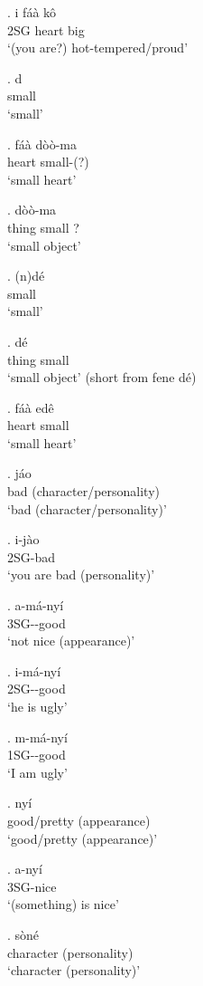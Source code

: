 \documentclass{assets/fieldnotes}
\begin{document}
\exg. i fáà kô\\
2SG heart big\\
`(you are?) hot-tempered/proud'

\exg. d\\
small\\
`small'

\exg. fáà dòò-ma\\
heart small-(?)\\
`small heart'

\exg.  dòò-ma\\
thing small ?\\
`small object'

\exg. (n)dé\\
small\\
`small'

\exg.  dé\\
thing small\\
`small object' (short from fene dé)

\exg. fáà edê\\
heart small\\
`small heart'

\exg. jáo\\
bad (character/personality)\\
`bad (character/personality)'

\exg. i-jào\\
2SG-bad\\
`you are bad (personality)'

\exg. a-má-nyí\\
3SG-\Neg{}-good\\
`not nice (appearance)'

\exg. i-má-nyí\\
2SG-\Neg{}-good\\
`he is ugly'

\exg. m-má-nyí\\
1SG-\Neg{}-good\\
`I am ugly'

\exg. nyí\\
good/pretty (appearance)\\
`good/pretty (appearance)'

\exg. a-nyí\\
3SG-nice\\
`(something) is nice'

\exg. sòné\\
character (personality)\\
`character (personality)'
\end{document}

